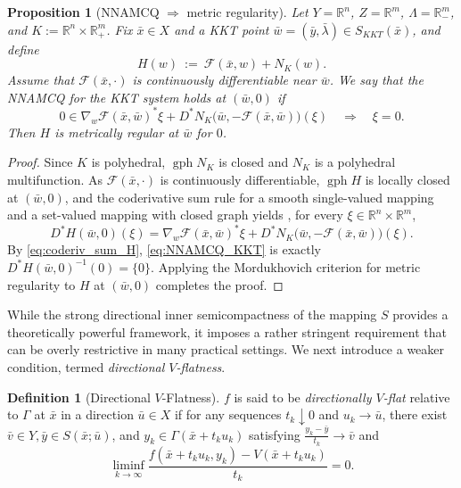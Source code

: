 \documentclass[12pt,twoside,reqno]{amsart}
\newtheorem{proposition}[theorem]{Proposition}
\theoremstyle{definition}
\newtheorem{definition}[theorem]{Definition}
\numberwithin{equation}{section}
\begin{document}
\begin{proposition}[NNAMCQ $\Rightarrow$ metric regularity]\label{prop: NNAMCQ metric regularity KKT}
Let $Y=\mathbb{R}^n$, $Z=\mathbb{R}^m$, $\Lambda=\mathbb{R}^m_-$, and $K:=\mathbb{R}^n\times\mathbb{R}^m_+$. 
Fix $\bar{x}\in X$ and a KKT point $\bar{w}=(\bar{y},\bar{\lambda})\in S_{KKT}(\bar{x})$, and define
\[
H(w)\ :=\ \mathcal{F}(\bar{x}, w) + N_K(w).
\]
Assume that $\mathcal{F}(\bar{x},\cdot)$ is continuously differentiable near $\bar{w}$. 
We say that the \emph{NNAMCQ for the KKT system} holds at $(\bar{w},0)$ if
\begin{equation}\label{eq:NNAMCQ_KKT}
    0\in \nabla_w\mathcal{F}(\bar{x},\bar{w})^*\xi + D^*N_K\bigl(\bar{w},-\mathcal{F}(\bar{x},\bar{w})\bigr)(\xi)
    \quad\Longrightarrow\quad
    \xi=0.
\end{equation}
Then $H$ is metrically regular at $\bar{w}$ for $0$. 
\end{proposition}

\begin{proof}
Since $K$ is polyhedral, $\operatorname{gph} N_K$ is closed and $N_K$ is a polyhedral multifunction. 
As $\mathcal{F}(\bar{x},\cdot)$ is continuously differentiable, $\operatorname{gph} H$ is locally closed at $(\bar{w},0)$, and the coderivative sum rule for a smooth single-valued mapping and a set-valued mapping with closed graph yields \cite[Theorem~1.62]{Mordukhovich2006variational}, for every $\xi\in \mathbb{R}^n\times\mathbb{R}^m$,
\begin{equation}\label{eq:coderiv_sum_H}
    D^*H(\bar{w},0)(\xi)
    =
    \nabla_w\mathcal{F}(\bar{x},\bar{w})^*\xi + D^*N_K\bigl(\bar{w},-\mathcal{F}(\bar{x},\bar{w})\bigr)(\xi). 
\end{equation} 
By \eqref{eq:coderiv_sum_H}, \eqref{eq:NNAMCQ_KKT} is exactly $D^*H(\bar{w},0)^{-1}(0)=\{0\}$. 
Applying the Mordukhovich criterion for metric regularity \cite[Corollary 4.3]{mordukhovich1993complete} to $H$ at $(\bar{w},0)$ completes the proof. 
\end{proof}

While the strong directional inner semicompactness of the mapping $S$ provides a theoretically powerful framework, it imposes a rather stringent requirement that can be overly restrictive in many practical settings. We next introduce a weaker condition, termed \textit{directional $V$-flatness}.  

\begin{definition}[Directional $V$-Flatness]\label{defn: gamma V flatness}
$f$ is said to be \emph{directionally $V$-flat} relative to $\Gamma$ at $\bar{x}$ in a direction $\bar{u} \in X$  
if for any sequences $t_k \downarrow 0$ and $u_k \to \bar{u}$, there exist $\bar v\in Y, \bar y\in S(\bar x;\bar u)$, and $y_k \in \Gamma(\bar{x} + t_k u_k)$ satisfying $\frac{y_k - \bar{y}}{t_k} \to \bar{v}$ and 
\begin{equation}\label{eq: V flatness}
    \liminf_{k \to \infty} \frac{f(\bar{x} + t_k u_k, y_k) - V(\bar{x} + t_k u_k)}{t_k} = 0.
\end{equation}
\end{definition}
\end{document}
